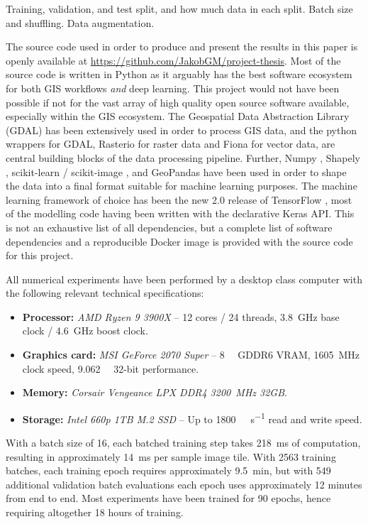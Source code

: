 
Training, validation, and test split, and how much data in each split.
Batch size and shuffling.
Data augmentation.


The source code used in order to produce and present the results in this paper is openly available at \url{https://github.com/JakobGM/project-thesis}.
Most of the source code is written in Python as it arguably has the best software ecosystem for both GIS workflows \emph{and} deep learning.
This project would not have been possible if not for the vast array of high quality open source software available, especially within the GIS ecosystem.
The Geospatial Data Abstraction Library (GDAL) \cite{dep:gdal} has been extensively used in order to process GIS data, and the python wrappers for GDAL, Rasterio \cite{dep:rasterio} for raster data and Fiona \cite{dep:fiona} for vector data, are central building blocks of the data processing pipeline.
Further, Numpy \cite{dep:numpy}, Shapely \cite{dep:shapely}, scikit-learn \cite{dep:sklearn} / scikit-image \cite{dep:sklearn}, and GeoPandas \cite{dep:geopandas} have been used in order to shape the data into a final format suitable for machine learning purposes.
The machine learning framework of choice has been the new 2.0 release of TensorFlow \cite{dep:tensorflow}, most of the modelling code having been written with the declarative Keras API.
This is not an exhaustive list of all dependencies, but a complete list of software dependencies and a reproducible Docker \cite{dep:docker} image is provided with the source code for this project.


All numerical experiments have been performed by a desktop class computer with the following relevant technical specifications:

\begin{itemize}
  \item \textbf{Processor:} \textit{AMD Ryzen 9 3900X} -- 12 cores / 24 threads, \SI{3.8}{\giga\hertz} base clock / \SI{4.6}{\giga\hertz} boost clock.
  \item \textbf{Graphics card:} \textit{MSI GeForce 2070 Super} -- \SI{8}{\giga\byte} GDDR6 VRAM, \SI{1605}{\mega\hertz} clock speed, \SI{9.062}{\tera\flops} 32-bit performance.
  \item \textbf{Memory:} \textit{Corsair Vengeance LPX DDR4 \SI{3200}{\mega\hertz} 32GB}.
  \item \textbf{Storage:} \textit{Intel 660p 1TB M.2 SSD} -- Up to \SI{1800}{\mega\byte\per\second} read and write speed.
\end{itemize}

With a batch size of 16, each batched training step takes \SI{218}{\milli\second} of computation, resulting in approximately \SI{14}{\milli\second} per sample image tile.
With \num{2563} training batches, each training epoch requires approximately \SI{9.5}{\minute}, but with \num{549} additional validation batch evaluations each epoch uses approximately 12 minutes from end to end.
Most experiments have been trained for 90 epochs, hence requiring altogether 18 hours of training.

